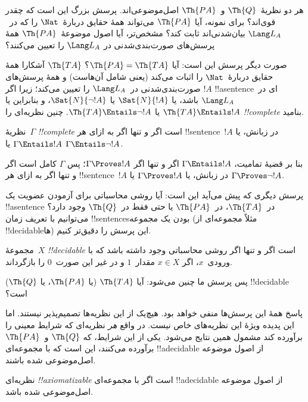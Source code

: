 \documentclass[../../../include/open-logic-section]{subfiles}
\begin{document}
هر دو نظریهٔ~$\Th{Q}$ و~$\Th{PA}$ اصل‌موضوعی‌اند. پرسش بزرگ این است
که چقدر قوی‌اند؟ برای نمونه، آیا $\Th{PA}$ می‌تواند همهٔ حقایق
دربارهٔ~$\Nat$ را که در~$\Lang L_A$ بیان‌شدنی‌اند ثابت کند؟
مشخص‌تر، آیا اصول موضوعهٔ~$\Th{PA}$ همهٔ پرسش‌های صورت‌بندی‌شدنی در
$\Lang L_A$ را تعیین می‌کنند؟

صورت دیگر پرسش این است: آیا $\Th{PA}=\Th{TA}$؟ $\Th{TA}$ آشکارا
همهٔ حقایق دربارهٔ~$\Nat$ را اثبات می‌کند (یعنی شامل آن‌هاست) و همهٔ
پرسش‌های صورت‌بندی‌شدنی در~$\Lang L_A$ را تعیین می‌کند؛ زیرا اگر
$!A$ !!a{sentence}ای در~$\Lang L_A$ باشد، یا $\Sat{N}{!A}$ یا
$\Sat{N}{\lnot !A}$، و بنابراین یا $\Th{TA}\Entails !A$ یا
$\Th{TA}\Entails\lnot !A$. چنین نظریه‌ای را \emph{!!{complete}} بنامید.

\begin{defn}
نظریهٔ~$\Gamma$ \emph{!!{complete}} است اگر و تنها اگر به ازای هر
!!{sentence}ٔ~$!A$ در زبانش، یا $\Gamma\Entails !A$ یا
$\Gamma\Entails\lnot !A$.
\end{defn}

\begin{explain}
بنا بر قضیهٔ تمامیت، $\Gamma\Entails !A$ اگر و تنها اگر
$\Gamma\Proves !A$؛ پس $\Gamma$ کامل است اگر و تنها اگر به ازای هر
!!{sentence}ٔ~$!A$ در زبانش، یا $\Gamma\Proves !A$ یا
$\Gamma\Proves\lnot !A$.
\end{explain}

پرسش دیگری که پیش می‌آید این است: آیا روشی محاسباتی برای آزمودن عضویت
یک !!a{sentence} در~$\Th{TA}$، در~$\Th{PA}$ یا حتی فقط در~$\Th{Q}$ وجود
دارد؟ می‌توانیم با تعریف زمان !!{sentence}sبودن یک مجموعه (مثلاً
مجموعه‌ای از !!{decidable}ها) این پرسش را دقیق‌تر کنیم.

\begin{defn}
مجموعهٔ~$X$ \emph{!!{decidable}} است اگر و تنها اگر روشی محاسباتی
وجود داشته باشد که با ورودی~$x$، اگر $x\in X$ مقدار~$1$ و در غیر این
صورت~$0$ را بازگرداند.
\end{defn}

پس پرسش ما چنین می‌شود: آیا $\Th{TA}$ (یا $\Th{PA}$، یا $\Th{Q}$)
!!{decidable} است؟

پاسخ همهٔ این پرسش‌ها منفی خواهد بود. هیچ‌یک از این نظریه‌ها
تصمیم‌پذیر نیستند. اما این پدیده ویژهٔ این نظریه‌های خاص نیست. در
واقع \emph{هر} نظریه‌ای که شرایط معینی را برآورده کند مشمول همین
نتایج می‌شود. یکی از این شرایط، که $\Th{Q}$ و~$\Th{PA}$ برآورده
می‌کنند، این است که با مجموعه‌ای !!a{decidable} از اصول موضوعه
اصل‌موضوعی شده باشند.

\begin{defn}
نظریه‌ای \emph{!!{axiomatizable}} است اگر با مجموعه‌ای
!!a{decidable} از اصول موضوعه اصل‌موضوعی شده باشد.
\end{defn}
\end{document}
